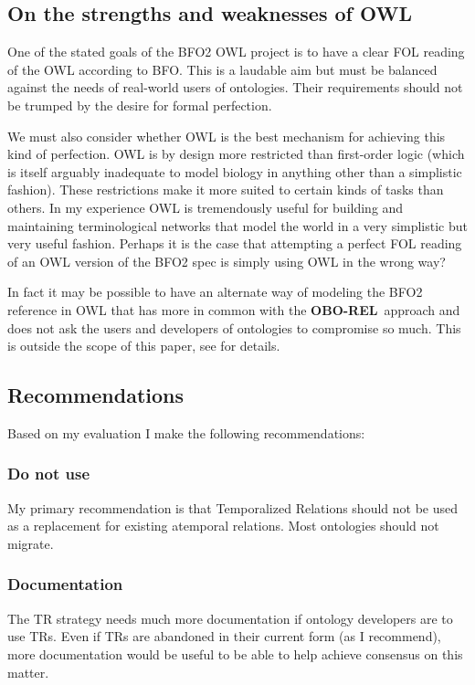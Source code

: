 \documentclass{bioinfo}
\def\OBOREL{\textbf{OBO-REL}}
\begin{document}
\subsection{On the strengths and weaknesses of OWL}

One of the stated goals of the BFO2 OWL project is to have a clear FOL
reading of the OWL according to BFO. This is a laudable aim but must
be balanced against the needs of real-world users of ontologies. Their
requirements should not be trumped by the desire for formal perfection.

We must also consider whether OWL is the best mechanism for achieving
this kind of perfection. OWL is by design more restricted than
first-order logic (which is itself arguably inadequate to model
biology in anything other than a simplistic fashion). These
restrictions make it more suited to certain kinds of tasks than
others. In my experience OWL is tremendously useful for building and
maintaining terminological networks that model the world in a very
simplistic but very useful fashion. Perhaps it is the case that
attempting a perfect FOL reading of an OWL version of the BFO2 spec is
simply using OWL in the wrong way?

In fact it may be possible to have an alternate way of modeling the
BFO2 reference in OWL that has more in common with the \OBOREL\
approach and does not ask the users and developers of ontologies to
compromise so much. This is outside the scope of this paper, see
\cite{Grewe} for details.

\subsection{Recommendations}

Based on my evaluation I make the following recommendations:

\subsubsection{Do not use} My primary recommendation is that
Temporalized Relations should not be used as a replacement for
existing atemporal relations. Most ontologies should not migrate.

\subsubsection{Documentation} The TR strategy needs much more
documentation if ontology developers are to use TRs. Even if TRs are
abandoned in their current form (as I recommend), more documentation
would be useful to be able to help achieve consensus on this matter.
\end{document}

